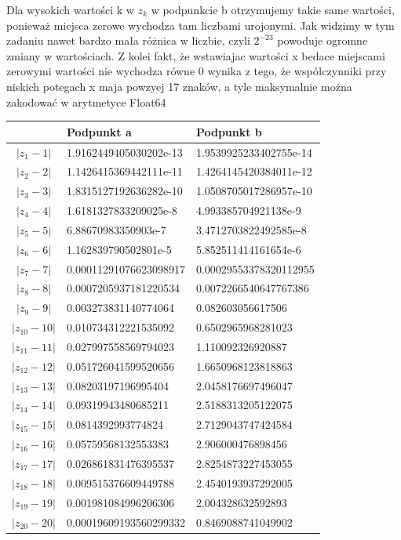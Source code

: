 \documentclass{article} %
\begin{document}
		Dla wysokich wartości k w $z_k$ w podpunkcie b otrzymujemy takie same wartości, ponieważ miejsca zerowe wychodza tam liczbami urojonymi.
		Jak widzimy w tym zadaniu nawet bardzo mała różnica w liczbie, czyli $2^{-23}$ powoduje ogromne zmiany w wartościach. Z kolei fakt, że wstawiajac wartości x bedace miejscami zerowymi wartości nie wychodza równe 0 wynika z tego, że współczynniki przy niskich potegach x maja powzyej 17 znaków, a tyle maksymalnie można zakodować w arytmetyce Float64
		
		\vspace{0.1cm}
		\begin{tabularx}{\textwidth}{|c|X|X|}
		\hline
		\textbf{} & \textbf{Podpunkt a} & \textbf{Podpunkt b} \\
		\hline
		$|z_1 - 1|$ & 1.9162449405030202e-13 & 1.9539925233402755e-14 \\
		\hline
		$|z_2 - 2|$ & 1.1426415369442111e-11 &  1.4264145420384011e-12 \\
		\hline
		$|z_3 - 3|$ & 1.8315127192636282e-10 & 1.0508705017286957e-10\\
		\hline
		$|z_4 - 4|$ & 1.6181327833209025e-8 & 4.993385704921138e-9\\
		\hline
		$|z_5 - 5|$ & 6.88670983350903e-7 & 3.4712703822492585e-8\\
		\hline
		$|z_6 - 6|$ & 1.162839790502801e-5 & 5.852511414161654e-6 \\
		\hline
		$|z_7 - 7|$ & 0.00011291076623098917 & 0.00029553378320112955 \\
		\hline
		$|z_8 - 8|$ & 0.0007205937181220534 & 0.0072266540647767386 \\
		\hline
		$|z_9 - 9|$ & 0.003273831140774064 & 0.082603056617506 \\
		\hline
		$|z_{10} - 10|$ & 0.010734312221535092 & 0.6502965968281023 \\
		\hline
		$|z_{11} - 11|$ & 0.027997558569794023 & 1.110092326920887 \\
		\hline
		$|z_{12} - 12|$ & 0.051726041599520656 & 1.6650968123818863 \\
		\hline
		$|z_{13} - 13|$ & 0.08203197196995404 & 2.0458176697496047 \\
		\hline
		$|z_{14} - 14|$ & 0.09319943480685211 &  2.5188313205122075 \\
		\hline
		$|z_{15} - 15|$ & 0.0814392993774824 & 2.7129043747424584 \\
		\hline
		$|z_{16} - 16|$ & 0.05759568132553383 & 2.906000476898456 \\
		\hline
		$|z_{17} - 17|$ & 0.026861831476395537 & 2.8254873227453055 \\
		\hline
		$|z_{18} - 18|$ & 0.009515376609449788 & 2.4540193937292005 \\
		\hline
		$|z_{19} - 19|$ &  0.001981084996206306 &  2.004328632592893 \\
		\hline
		$|z_{20} - 20|$ & 0.00019609193560299332 & 0.8469088741049902 \\
		\hline
		\end{tabularx}
		\vspace{0.1cm}
\end{document}
